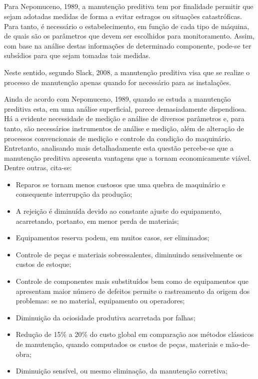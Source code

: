 \documentclass[
	12pt,				
	oneside,			
	a4paper,			
	english,			
	brazil,			
	]{abntex2ppgsi}
\begin{document}
\subsection{}

Para Nepomuceno, 1989, a manutenção preditiva tem por finalidade permitir que sejam adotadas medidas de forma a evitar estragos ou situações catastróficas. Para tanto, é necessário o estabelecimento, em função de cada tipo de máquina, de quais são os parâmetros que devem ser escolhidos para monitoramento. Assim, com base na análise destas informações de determinado componente, pode-se ter subsídios para que sejam tomadas tais medidas. 

Neste sentido, segundo Slack, 2008, a manutenção preditiva visa que se realize o processo de manutenção apenas quando for necessário para as instalações. 

Ainda de acordo com Nepomuceno, 1989, quando se estuda a manutenção preditiva esta, em uma análise superficial, parece demasiadamente dispendiosa. Há a evidente necessidade de medição e análise de diversos parâmetros e, para tanto, são necessários instrumentos de análise e medição, além de alteração de processos convencionais de medição e controle da condição do maquinário. Entretanto, analisando mais detalhadamente esta questão percebe-se que a manutenção preditiva apresenta vantagens que a tornam economicamente viável. Dentre outras, cita-se: 

\begin{itemize}
	\item Reparos se tornam menos custosos que uma quebra de maquinário e consequente interrupção da produção;
	\item A rejeição é diminuída devido ao constante ajuste do equipamento, acarretando, portanto, em menor perda de materiais;
	\item Equipamentos reserva podem, em muitos casos, ser eliminados;
	\item Controle de peças e materiais sobressalentes, diminuindo sensivelmente os custos de estoque;
	\item Controle de componentes mais substituídos bem como de equipamentos que apresentam maior número de defeitos permite o rastreamento da origem dos problemas: se no material, equipamento ou operadores;
	\item Diminuição da ociosidade produtiva acarretada por falhas;
	\item Redução de 15\% a 20\% do custo global em comparação aos métodos clássicos de manutenção, quando computados os custos de peças, materiais e mão-de-obra;
	\item Diminuição sensível, ou mesmo eliminação, da manutenção corretiva;
\end{itemize}
\end{document}
